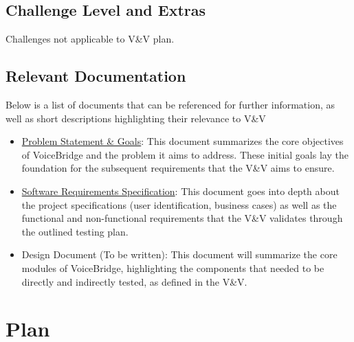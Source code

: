 \documentclass[12pt, titlepage]{article}
\begin{document}
\subsection{Challenge Level and Extras}

Challenges not applicable to V\&V plan.

\subsection{Relevant Documentation}




Below is a list of documents that can be referenced for further information, as well as short descriptions highlighting their relevance to V\&V
\begin{itemize}
  \item \href{https://github.com/speech-buddies/VoiceBridge/blob/main/docs/ProblemStatementAndGoals/ProblemStatement.pdf}{Problem Statement \& Goals}: This document summarizes the core objectives of VoiceBridge and the problem it aims to address. These initial goals lay the foundation for the subsequent requirements that the V\&V aims to ensure.
  \item \href{https://github.com/speech-buddies/VoiceBridge/blob/main/docs/SRS-Volere/SRS.pdf}{Software Requirements Specification}: This document goes into depth about the project specifications (user identification, business cases) as well as the functional and non-functional requirements that the V\&V validates through the outlined testing plan. 
  \item Design Document (To be written): This document will summarize the core modules of VoiceBridge, highlighting the components that needed to be directly and indirectly tested, as defined in the V\&V.
\end{itemize}



\section{Plan}
\end{document}
